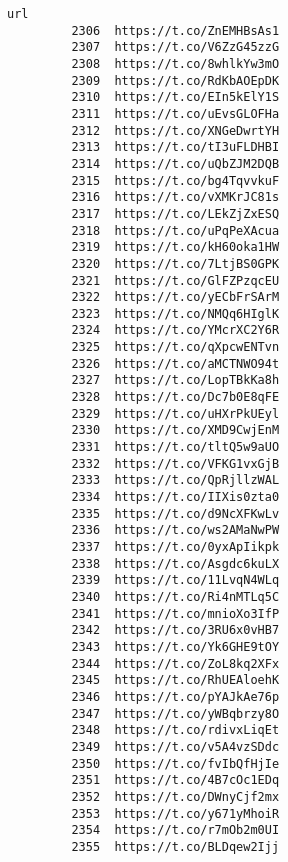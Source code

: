 \documentclass[11pt]{article}
\begin{document}
\begin{Verbatim}[commandchars=\\\{\}]
                                   url  
         2306  https://t.co/ZnEMHBsAs1  
         2307  https://t.co/V6ZzG45zzG  
         2308  https://t.co/8whlkYw3mO  
         2309  https://t.co/RdKbAOEpDK  
         2310  https://t.co/EIn5kElY1S  
         2311  https://t.co/uEvsGLOFHa  
         2312  https://t.co/XNGeDwrtYH  
         2313  https://t.co/tI3uFLDHBI  
         2314  https://t.co/uQbZJM2DQB  
         2315  https://t.co/bg4TqvvkuF  
         2316  https://t.co/vXMKrJC81s  
         2317  https://t.co/LEkZjZxESQ  
         2318  https://t.co/uPqPeXAcua  
         2319  https://t.co/kH60oka1HW  
         2320  https://t.co/7LtjBS0GPK  
         2321  https://t.co/GlFZPzqcEU  
         2322  https://t.co/yECbFrSArM  
         2323  https://t.co/NMQq6HIglK  
         2324  https://t.co/YMcrXC2Y6R  
         2325  https://t.co/qXpcwENTvn  
         2326  https://t.co/aMCTNWO94t  
         2327  https://t.co/LopTBkKa8h  
         2328  https://t.co/Dc7b0E8qFE  
         2329  https://t.co/uHXrPkUEyl  
         2330  https://t.co/XMD9CwjEnM  
         2331  https://t.co/tltQ5w9aUO  
         2332  https://t.co/VFKG1vxGjB  
         2333  https://t.co/QpRjllzWAL  
         2334  https://t.co/IIXis0zta0  
         2335  https://t.co/d9NcXFKwLv  
         2336  https://t.co/ws2AMaNwPW  
         2337  https://t.co/0yxApIikpk  
         2338  https://t.co/Asgdc6kuLX  
         2339  https://t.co/11LvqN4WLq  
         2340  https://t.co/Ri4nMTLq5C  
         2341  https://t.co/mnioXo3IfP  
         2342  https://t.co/3RU6x0vHB7  
         2343  https://t.co/Yk6GHE9tOY  
         2344  https://t.co/ZoL8kq2XFx  
         2345  https://t.co/RhUEAloehK  
         2346  https://t.co/pYAJkAe76p  
         2347  https://t.co/yWBqbrzy8O  
         2348  https://t.co/rdivxLiqEt  
         2349  https://t.co/v5A4vzSDdc  
         2350  https://t.co/fvIbQfHjIe  
         2351  https://t.co/4B7cOc1EDq  
         2352  https://t.co/DWnyCjf2mx  
         2353  https://t.co/y671yMhoiR  
         2354  https://t.co/r7mOb2m0UI  
         2355  https://t.co/BLDqew2Ijj  
\end{Verbatim}
            
\end{document}
